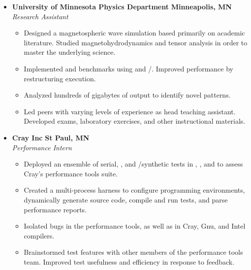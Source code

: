
\begin{itemize}[leftmargin=\parindent]
        \parskip=0.1em
        \itemsep=1.5em

    \item[]
        \headerrow
        {\textbf{University of Minnesota Physics Department}}
        {\textbf{Minneapolis, MN}}
        \\
        \headerrow
        {\emph{Research Assistant}}
        {\emph{}}
        \begin{itemize}
            \item Designed a magnetospheric wave simulation based primarily on academic literature. Studied magnetohydrodynamics and tensor analysis in order to master the underlying science. 
            \item Implemented \CPP and \Fortran benchmarks using \OpenMP and \MPI/\OpenMP. Improved performance by restructuring execution. 
            \item Analyzed hundreds of gigabytes of output to identify novel patterns. 
            \item Led peers with varying levels of experience as head teaching assistant. Developed exams, laboratory exercises, and other instructional materials. 
        \end{itemize}

    \item[]
        \headerrow
        {\textbf{Cray Inc}}
        {\textbf{St Paul, MN}}
        \\
        \headerrow
        {\emph{Performance Intern}}
        {\emph{}}
        \begin{itemize}
            \item Deployed an ensemble of serial, \MPI, and \MPI/\OpenMP synthetic tests in \C, \CPP, and \Fortran to assess Cray's performance tools suite. 
            \item Created a multi-process \Python harness to configure programming environments, dynamically generate source code, compile and run tests, and parse performance reports. 
            \item Isolated bugs in the performance tools, as well as in Cray, Gnu, and Intel compilers. 
            \item Brainstormed test features with other members of the performance tools team. Improved test usefulness and efficiency in response to feedback. 


\end{itemize}
\end{itemize}
